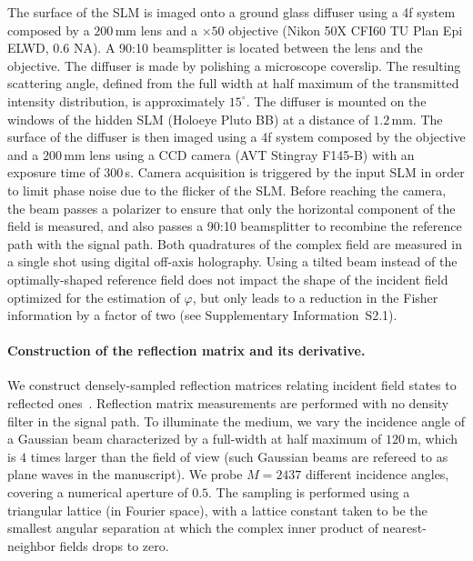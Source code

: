 \documentclass[aps,pra,twocolumn,amsmath,amssymb,superscriptaddress,10pt,nobibnotes]{revtex4-2}
\begin{document}
The surface of the SLM is imaged onto a ground glass diffuser using a 4f system composed by a $200$\,mm lens and a $\times50$ objective (Nikon 50X CFI60 TU Plan Epi ELWD, 0.6 NA). A 90:10 beamsplitter is located between the lens and the objective. The diffuser is made by polishing a microscope coverslip. The resulting scattering angle, defined from the full width at half maximum of the transmitted intensity distribution, is approximately $15^\circ$. The diffuser is mounted on the windows of the hidden SLM (Holoeye Pluto BB) at a distance of $1.2$\,mm. The surface of the diffuser is then imaged using a 4f system composed by the objective and a $200$\,mm lens using a CCD camera (AVT Stingray F145-B) with an exposure time of $300$\,\textmu s. Camera acquisition is triggered by the input SLM in order to limit phase noise due to the flicker of the SLM. Before reaching the camera, the beam passes a polarizer to ensure that only the horizontal component of the field is measured, and also passes a 90:10 beamsplitter to recombine the reference path with the signal path. Both quadratures of the complex field are measured in a single shot using digital off-axis holography. Using a tilted beam instead of the optimally-shaped reference field does not impact the shape of the incident field optimized for the estimation of $\varphi$, but only leads to a reduction in the Fisher information by a factor of two (see Supplementary Information~S2.1).

\paragraph*{Construction of the reflection matrix and its derivative.}

We construct densely-sampled reflection matrices relating incident field states to reflected ones~\cite{popoff_measuring_2010,pai_optical_2020}. Reflection matrix measurements are performed with no density filter in the signal path. To illuminate the medium, we vary the incidence angle of a Gaussian beam characterized by a full-width at half maximum of $120$\,\textmu m, which is $4$ times larger than the field of view (such Gaussian beams are refereed to as plane waves in the manuscript). We probe $M=2437$ different incidence angles, covering a numerical aperture of $0.5$. The sampling is performed using a triangular lattice (in Fourier space), with a lattice constant taken to be the smallest angular separation at which the complex inner product of nearest-neighbor fields drops to zero.
\end{document}
